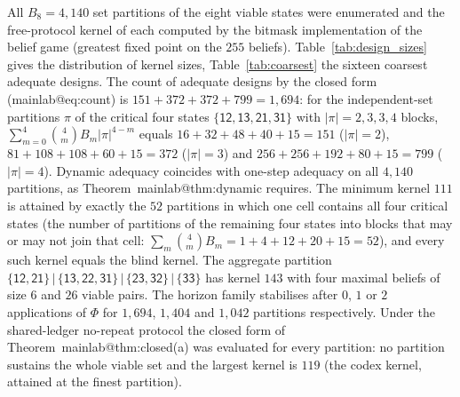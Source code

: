 \documentclass[11pt,a4paper]{article}
\makeatletter
\theoremstyle{plain}
\theoremstyle{definition}
\theoremstyle{remark}
\newcommand{\st}[1]{\mathsf{#1}}
\newcommand{\mref}[1]{\csname mainlab@#1\endcsname}
\newcommand{\meqref}[1]{(\mref{#1})}
\makeatother
\begin{document}
All $B_8=4{,}140$ set partitions of the eight viable states were enumerated and the free-protocol kernel of each computed by the bitmask implementation of the belief game (greatest fixed point on the $255$ beliefs). Table~\ref{tab:design_sizes} gives the distribution of kernel sizes, Table~\ref{tab:coarsest} the sixteen coarsest adequate designs. The count of adequate designs by the closed form \meqref{eq:count} is $151+372+372+799=1{,}694$: for the independent-set partitions $\pi$ of the critical four states $\{\st{12},\st{13},\st{21},\st{31}\}$ with $|\pi|=2,3,3,4$ blocks, $\sum_{m=0}^{4}\binom4m B_m|\pi|^{4-m}$ equals $16+32+48+40+15=151$ ($|\pi|=2$), $81+108+108+60+15=372$ ($|\pi|=3$) and $256+256+192+80+15=799$ ($|\pi|=4$). Dynamic adequacy coincides with one-step adequacy on all $4{,}140$ partitions, as Theorem~\mref{thm:dynamic} requires. The minimum kernel $111$ is attained by exactly the $52$ partitions in which one cell contains all four critical states (the number of partitions of the remaining four states into blocks that may or may not join that cell: $\sum_m\binom4m B_m=1+4+12+20+15=52$), and every such kernel equals the blind kernel. The aggregate partition $\{\st{12},\st{21}\}\,|\,\{\st{13},\st{22},\st{31}\}\,|\,\{\st{23},\st{32}\}\,|\,\{\st{33}\}$ has kernel $143$ with four maximal beliefs of size $6$ and $26$ viable pairs. The horizon family stabilises after $0$, $1$ or $2$ applications of $\Phi$ for $1{,}694$, $1{,}404$ and $1{,}042$ partitions respectively. Under the shared-ledger no-repeat protocol the closed form of Theorem~\mref{thm:closed}(a) was evaluated for every partition: no partition sustains the whole viable set and the largest kernel is $119$ (the codex kernel, attained at the finest partition).
\end{document}
